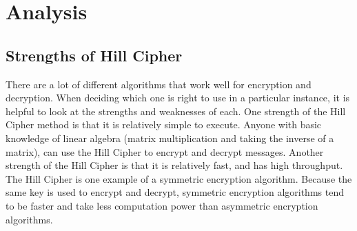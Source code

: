 \documentclass{article}
\begin{document}
\section{Analysis}
\subsection{Strengths of Hill Cipher}
There are a lot of different algorithms that work well for encryption and decryption. When deciding which one is right to use in a particular instance, it is helpful to look at the strengths and weaknesses of each. One strength of the Hill Cipher method is that it is relatively simple to execute. Anyone with basic knowledge of linear algebra (matrix multiplication and taking the inverse of a matrix), can use the Hill Cipher to encrypt and decrypt messages. Another strength of the Hill Cipher is that it is relatively fast, and has high throughput. The Hill Cipher is one example of a symmetric encryption algorithm. Because the same key is used to encrypt and decrypt, symmetric encryption algorithms tend to be faster and take less computation power than asymmetric encryption algorithms.
\end{document}

